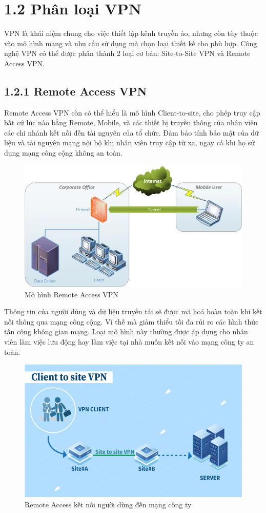     \section*{1.2 Phân loại VPN}
    VPN là khái niệm chung cho việc thiết lập kênh truyền ảo, nhưng còn tùy thuộc vào mô hình mạng và nhu cầu sử dụng mà chọn loại thiết kế cho phù hợp. Công nghệ VPN có thể được phân thành 2 loại cơ bản: Site-to-Site VPN và Remote Access VPN.
    \subsection*{1.2.1 Remote Access VPN}
    
    Remote Access VPN còn có thể hiểu là mô hình Client-to-site, cho phép truy cập bất cứ lúc nào bằng Remote, Mobile, và các thiết bị truyền thông của nhân viên các chi nhánh kết nối đến tài nguyên của tổ chức. Đảm bảo tính bảo mật của dữ liệu và tài nguyên mạng nội bộ khi nhân viên truy cập từ xa, ngay cả khi họ sử dụng mạng công cộng không an toàn.

    \begin{figure}[htbp]
        \centering
        \includegraphics[width=0.5\linewidth]{img/remote.png}
        \caption{Mô hình Remote Access VPN}
    \end{figure}

    Thông tin của người dùng và dữ liệu truyền tải sẽ được mã hoá hoàn toàn khi kết nối thông qua mạng công cộng. Vì thế mà giảm thiểu tối đa rủi ro các hình thức tấn công không gian mạng. Loại mô hình này thường được áp dụng cho nhân viên làm việc lưu động hay làm việc tại nhà muốn kết nối vào mạng công ty an toàn.

    \begin{figure}[htbp]
        \centering
        \includegraphics[width=0.7\linewidth]{img/vpn-client-to-site.jpeg}
        \caption{Remote Access kết nối người dùng đến mạng công ty}
    \end{figure}

